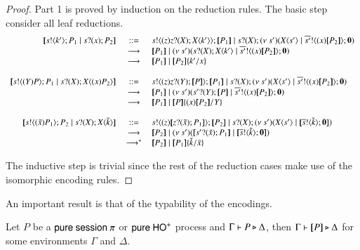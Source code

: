 \begin{proof}
Part 1 is proved by induction on the reduction rules. The basic step consider 
all leaf reductions.
\[
	\begin{array}{rcl}
		\map{\bout{s}{k'} P_1 \Par \binp{s}{x} P_2} &\bnfis& \bout{s}{ \abs{z}{\binp{z}{X} \appl{X}{k'}} } \map{P_1} \Par \binp{s}{X} \newsp{s'}{\appl{X}{s'} \Par \bout{\dual{s'}}{\abs{x} \map{P_2}} \inact}\\
		&\red& \map{P_1} \Par \newsp{s'}{\binp{s}{X} \appl{X}{k'} \Par \bout{\dual{s'}}{\abs{x} \map{P_2}} \inact}\\
		&\red& \map{P_1} \Par \map{P_2}\subst{k'}{x}
		\\
		\\

		\map{\bout{s}{\abs{\Y} P} P_1 \Par \binp{s}{X} \appl{X}{\abs{x}{P_2}}} &\bnfis& \bout{s}{\abs{z} \binp{z}{\Y} \map{P}} \map{P_1} \Par \binp{s}{X} \newsp{s'}{\appl{X}{s'} \Par \bout{\dual{s'}}{\abs{x}{\map{P_2}}} \inact}\\
		&\red& \map{P_1} \Par \newsp{s'}{\binp{s'}{\Y} \map{P} \Par \bout{\dual{s'}}{\abs{x}{\map{P_2}}} \inact}\\
		&\red& \map{P_1} \Par \map{P} \subst{\abs{x} \map{P_2}}{\Y}
		\\
		\\

		\map{\bout{s}{\abs{\tilde{x}}{P_1}} P_2 \Par \binp{s}{\X} \appl{\X}{\tilde{k}}} &\bnfis& \bout{s}{\abs{z}{\map{\binp{z}{\tilde{x}} P_1}}} \map{P_2} \Par \binp{s}{\X} \newsp{s'}{\appl{\X}{s'} \Par \map{\bout{\dual{s}}{\tilde{k}} \inact}} \\
		&\red& \map{P_2} \Par \newsp{s'}{\map{\binp{s'}{\tilde{x}} P_1} \Par \map{\bout{\dual{s}}{\tilde{k}} \inact}}\\
		&\red^*& \map{P_2} \Par \map{P_1} \subst{\tilde{k}}{\tilde{x}}
	\end{array}
\]

The inductive step is trivial since the rest of the reduction cases make
use of the isomorphic encoding rules.

\end{proof}

An important result is that of the typability of the encodings.

\begin{proposition}
	Let $P$ be a $\mathsf{pure\ session\ }\pi$ or $\mathsf{pure\ HO}^+$ process and $\Gamma \vdash P \triangleright \Delta$, then $\Gamma \vdash [\!\![P]\!\!] \triangleright \Delta$
	for some environments $\Gamma$ and $\Delta$.
\end{proposition}

